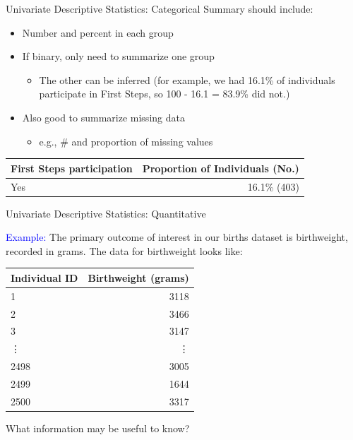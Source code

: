 \documentclass[10pt,t]{beamer}
\begin{document}
\begin{frame}{Univariate Descriptive Statistics: Categorical}
Summary should include:

\vspace{0.3cm}

\begin{itemize}
	\item Number and percent in each group
	\medskip
	\item If binary, only need to summarize one group
	\smallskip
	\begin{itemize}
		\item The other can be inferred (for example, we had 16.1\% of individuals participate in First Steps, so 100 - 16.1 = 83.9\% did not.)
	\end{itemize}
\medskip
	\item Also good to summarize missing data
	\smallskip
	\begin{itemize}
		\item e.g., \# and proportion of missing values
	\end{itemize}
\end{itemize}
\medskip


\begin{table}
	\centering
	\begin{tabular}{l|r}
		\textbf{First Steps participation} & \textbf{Proportion of Individuals (No.)} \\
		\hline
		Yes & 16.1\% (403)\\
	\end{tabular}
\end{table}
	
\end{frame}

\begin{frame}{Univariate Descriptive Statistics: Quantitative}

\textcolor{blue}{Example:} The primary outcome of interest in our births dataset is birthweight, recorded in grams. The data for birthweight looks like:

\vspace{0.3cm}

\begin{table}
	\centering
	\begin{tabular}{l|r}
		\textbf{Individual ID} & \textbf{Birthweight (grams)} \\
		\hline
		1 & 3118\\
		\hline
		2 & 3466\\
		\hline
		3 & 3147 \\
		\hline 
		\vdots & \vdots \\
		\hline
		2498 & 3005 \\
		\hline 
		2499 & 1644 \\
		2500 & 3317
	\end{tabular}
\end{table}

\vspace{0.3cm}

What information may be useful to know?

\end{frame}
\end{document}
